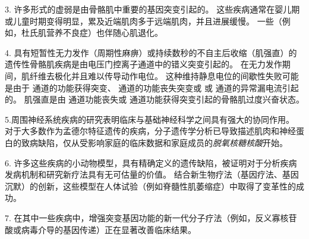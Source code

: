 3. 许多形式的虚弱是由骨骼肌中重要的基因突变引起的。
这些疾病通常在婴儿期或儿童时期变得明显，累及近端肌肉多于远端肌肉，并且进展缓慢。
一些（例如，杜氏肌营养不良症）也伴随心肌退化。


4. 具有短暂性无力发作（周期性麻痹）或持续数秒的不自主后收缩（肌强直）的遗传性骨骼肌疾病是由电压门控离子通道中的错义突变引起的。
在无力发作期间，肌纤维去极化并且难以传导动作电位。
这种维持静息电位的间歇性失败可能是由于  通道的功能获得突变、 通道的功能丧失突变或  或  通道的异常漏电流引起的。
肌强直是由  通道功能丧失或  通道功能获得突变引起的骨骼肌过度兴奋状态。


5.周围神经系统疾病的研究表明临床与基础神经科学之间具有强大的协同作用。
对于大多数作为孟德尔特征遗传的疾病，分子遗传学分析已导致描述肌肉和神经蛋白的致病缺陷，仅从受影响家庭的临床数据和家庭成员的\textit{脱氧核糖核酸}开始。


6. 许多这些疾病的小动物模型，具有精确定义的遗传缺陷，被证明对于分析疾病发病机制和研究新疗法具有无可估量的价值。
结合新生物疗法（基因疗法、基因沉默）的创新，这些模型在人体试验（例如脊髓性肌萎缩症）中取得了变革性的成功。


7. 在其中一些疾病中，增强突变基因功能的新一代分子疗法（例如，反义寡核苷酸或病毒介导的基因传递）正在显著改善临床结果。


